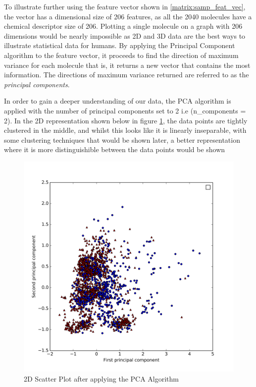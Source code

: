 \documentclass[a4paper,12pt]{report}
\begin{document}
		To illustrate further using the feature vector shown in \ref{matrix:samp_feat_vec}, the vector has a dimensional size of 206 features, as all the 2040 molecules have a chemical descriptor size of 206. Plotting a single molecule on a graph with 206 dimensions would be nearly impossible as 2D and 3D data are the best ways to illustrate statistical data for humans. By applying the Principal Component algorithm to the feature vector, it proceeds to find the direction of maximum variance for each molecule that is, it returns a new vector that contains the most information. The directions of maximum variance returned are referred to as the \textit{principal components}.
		
		In order to gain a deeper understanding of our data, the PCA algorithm is applied with the number of principal components set to 2 i.e (n\_components = 2). In the 2D representation shown below in figure \ref{fig:scatter_pca_2D}, the data points are tightly clustered in the middle, and whilst this looks like it is linearly inseparable, with some clustering techniques that would be shown later, a better representation where it is more distinguishible between the data points would be shown
		\begin{figure}[H]
			\centering
			\includegraphics[width=\textwidth,scale=1,totalheight=0.5\textheight]{images/scatter_pca}
			\caption{2D Scatter Plot after applying the PCA Algorithm}
			\label{fig:scatter_pca_2D}
		\end{figure}
	
\end{document}
